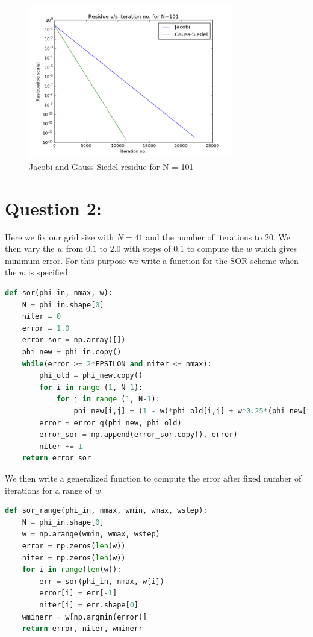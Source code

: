 \documentclass[11pt, a4paper]{article}
\begin{document}
\begin{figure}[H]
 \centering
 \includegraphics[width = 0.8\textwidth]{N_101_1.png}
 \caption{Jacobi and Gauss Siedel residue for N = 101}
\end{figure}



\section{Question 2:}
Here we fix our grid size with $N = 41$ and the number of iterations to $20$. We then vary the $w$ from $0.1$ to $2.0$ with
steps of $0.1$ to compute the $w$ which gives minimum error.
For this purpose we write a function for the SOR scheme when the $w$ is specified:
\begin{lstlisting}[language = Python, caption = Function to solve Laplace equation by SOR scheme]
def sor(phi_in, nmax, w):
    N = phi_in.shape[0]
    niter = 0
    error = 1.0
    error_sor = np.array([])
    phi_new = phi_in.copy()
    while(error >= 2*EPSILON and niter <= nmax):
        phi_old = phi_new.copy()
        for i in range (1, N-1):
            for j in range (1, N-1):
                phi_new[i,j] = (1 - w)*phi_old[i,j] + w*0.25*(phi_new[i+1,j]+phi_new[i-1,j]+phi_new[i,j+1]+phi_new[i,j-1])
        error = error_q(phi_new, phi_old)
        error_sor = np.append(error_sor.copy(), error)
        niter += 1
    return error_sor
\end{lstlisting}
We then write a generalized function to compute the error after fixed number of iterations for a range of $w$.
\begin{lstlisting}[language = Python, caption = Function to solve Laplace equation by SOR scheme for range of w]
def sor_range(phi_in, nmax, wmin, wmax, wstep): 
    N = phi_in.shape[0]
    w = np.arange(wmin, wmax, wstep)
    error = np.zeros(len(w))
    niter = np.zeros(len(w))
    for i in range(len(w)):
        err = sor(phi_in, nmax, w[i])
        error[i] = err[-1]
        niter[i] = err.shape[0]
    wminerr = w[np.argmin(error)]
    return error, niter, wminerr
\end{lstlisting}
\end{document}
